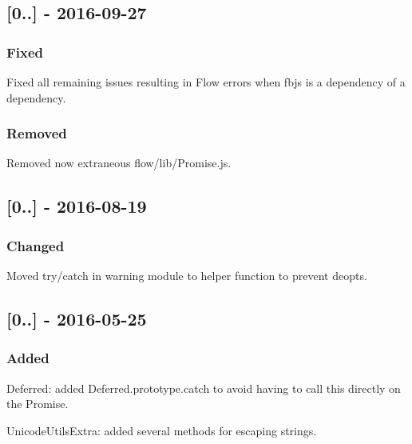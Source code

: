 \subsection*{\mbox{[}0..\mbox{]} -\/ 2016-\/09-\/27}

\subsubsection*{Fixed}


\begin{DoxyItemize}
\item Fixed all remaining issues resulting in Flow errors when {\ttfamily fbjs} is a dependency of a dependency.
\end{DoxyItemize}

\subsubsection*{Removed}


\begin{DoxyItemize}
\item Removed now extraneous {\ttfamily flow/lib/\+Promise.\+js}.
\end{DoxyItemize}

\subsection*{\mbox{[}0..\mbox{]} -\/ 2016-\/08-\/19}

\subsubsection*{Changed}


\begin{DoxyItemize}
\item Moved {\ttfamily try/catch} in {\ttfamily warning} module to helper function to prevent deopts.
\end{DoxyItemize}

\subsection*{\mbox{[}0..\mbox{]} -\/ 2016-\/05-\/25}

\subsubsection*{Added}


\begin{DoxyItemize}
\item {\ttfamily Deferred}\+: added {\ttfamily Deferred.\+prototype.\+catch} to avoid having to call this directly on the Promise.
\item {\ttfamily Unicode\+Utils\+Extra}\+: added several methods for escaping strings.
\end{DoxyItemize}


